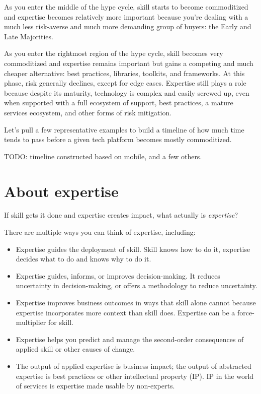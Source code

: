 As you enter the middle of the hype cycle, skill starts to become commoditized and expertise becomes relatively more important because you're dealing with a much less risk-averse and much more demanding group of buyers: the Early and Late Majorities.

As you enter the rightmost region of the hype cycle, skill becomes very commoditized and expertise remains important but gains a competing and much cheaper alternative: best practices, libraries, toolkits, and frameworks. At this phase, risk generally declines, except for edge cases. Expertise still plays a role because despite its maturity, technology is complex and easily screwed up, even when supported with a full ecosystem of support, best practices, a mature services ecosystem, and other forms of risk mitigation.

Let's pull a few representative examples to build a timeline of how much time tends to pass before a given tech platform becomes mostly commoditized.

TODO: timeline constructed based on mobile, and a few others.

\section{About expertise}

If skill gets it done and expertise creates impact, what actually is \emph{expertise}?

There are multiple ways you can think of expertise, including:

\begin{itemize}
\item Expertise guides the deployment of skill. Skill knows how to do it, expertise decides what to do and knows why to do it.
\item Expertise guides, informs, or improves decision-making. It reduces uncertainty in decision-making, or offers a methodology to reduce uncertainty.
\item Expertise improves business outcomes in ways that skill alone cannot because expertise incorporates more context than skill does. Expertise can be a force-multiplier for skill.
\item Expertise helps you predict and manage the second-order consequences of applied skill or other causes of change.
\item The output of applied expertise is business impact; the output of abstracted expertise is best practices or other intellectual property (IP). IP in the world of services is expertise made usable by non-experts.
\end{itemize}

